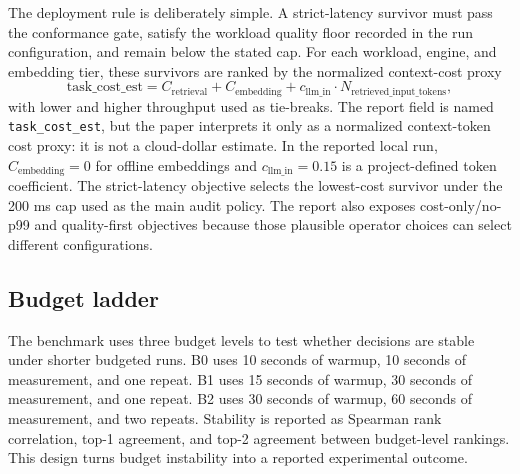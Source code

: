 The deployment rule is deliberately simple. A strict-latency survivor must pass the conformance gate, satisfy the workload quality floor recorded in the run configuration, and remain below the stated \maxrowp cap. For each workload, engine, and embedding tier, these survivors are ranked by the normalized context-cost proxy
\[
\mathrm{task\_cost\_est}=C_{\mathrm{retrieval}}+C_{\mathrm{embedding}}+c_{\mathrm{llm\_in}}\cdot N_{\mathrm{retrieved\_input\_tokens}},
\]
with lower \maxrowp and higher throughput used as tie-breaks. The report field is named \texttt{task\_cost\_est}, but the paper interprets it only as a normalized context-token cost proxy: it is not a cloud-dollar estimate. In the reported local run, \(C_{\mathrm{embedding}}=0\) for offline embeddings and \(c_{\mathrm{llm\_in}}=0.15\) is a project-defined token coefficient. The strict-latency objective selects the lowest-cost survivor under the 200 ms \maxrowp cap used as the main audit policy. The report also exposes cost-only/no-p99 and quality-first objectives because those plausible operator choices can select different configurations.

\begin{center}
\end{center}

\subsection{Budget ladder}

The benchmark uses three budget levels to test whether decisions are stable under shorter budgeted runs. B0 uses 10 seconds of warmup, 10 seconds of measurement, and one repeat. B1 uses 15 seconds of warmup, 30 seconds of measurement, and one repeat. B2 uses 30 seconds of warmup, 60 seconds of measurement, and two repeats. Stability is reported as Spearman rank correlation, top-1 agreement, and top-2 agreement between budget-level rankings. This design turns budget instability into a reported experimental outcome.
